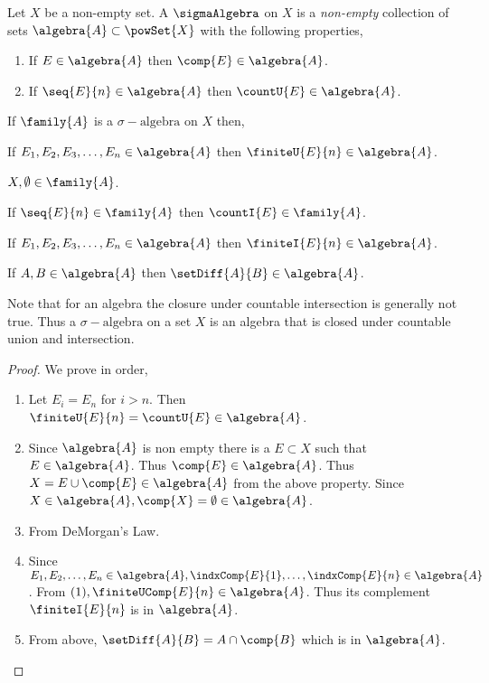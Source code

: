 \begin{Definition}[name=Sigma-Algebra of sets]
    Let $X$ be a non-empty set. A $\sigmaAlgebra$  on $X$ is a 
    \emph{non-empty} collection of sets $\algebra{A} \subset \powSet{X}$ with the following properties,
    \begin{enumerate}
	\item If $E \in \algebra{A}$ then $\comp{E} \in \algebra{A}$.
	\item If $\seq{E}{n} \in \algebra{A}$ then $\countU{E} \in \algebra{A}$.
    \end{enumerate} 
\end{Definition}
\begin{Theorem}[name=Properties of sigma algebras]\label{thm:prop_sigmaA}
    If $\family{A}$ is a $\sigma - \text{algebra}$ on $X$ then,
    \begin{properties}
	\item If $E_1,E_2,E_3,\dots, E_n \in \algebra{A}$ then $\finiteU{E}{n} \in \algebra{A}$.
	\item $X, \emptyset \in \family{A}$.
	\item If $\seq{E}{n} \in \family{A}$ then $\countI{E} \in \family{A}$.
	\item If $E_1,E_2,E_3,\dots, E_n \in \algebra{A}$ then $\finiteI{E}{n} \in \algebra{A}$.
	\item If $A,B \in \algebra{A}$ then $\setDiff{A}{B} \in \algebra{A}$.
    \end{properties}
\end{Theorem}
Note that for an algebra the closure under countable intersection is generally not true. 
Thus a $\sigma - \text{algebra}$ on a set $X$ is an algebra that is closed under countable union and
intersection.
\begin{proof}
    We prove in order,
    \begin{enumerate}
	\item Let $E_i = E_n$ for $i > n$. Then $\finiteU{E}{n} = \countU{E} \in \algebra{A}$.
	\item Since $\algebra{A}$ is non empty there is a $E \subset X$ such that $E \in
	    \algebra{A}$. Thus $\comp{E} \in \algebra{A}$. Thus $X = E \cup \comp{E} \in
	    \algebra{A}$ from the above property. Since $X \in \algebra{A}, \comp{X} = \emptyset \in
	    \algebra{A}$.
	\item From DeMorgan's Law.
	\item Since $E_1,E_2,\dots,E_n \in \algebra{A}, \indxComp{E}{1},\dots,\indxComp{E}{n} \in
	    \algebra{A}$. From $(1), \finiteUComp{E}{n} \in \algebra{A}$. Thus its complement
	    $\finiteI{E}{n}$ is in $\algebra{A}$.
	\item From above, $\setDiff{A}{B} = A \cap {\comp{B}}$ which is in $\algebra{A}$.
    \end{enumerate}
\end{proof}

